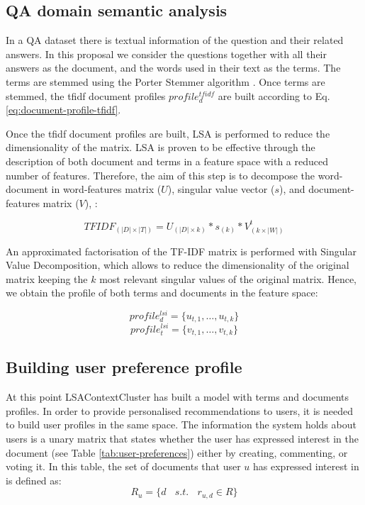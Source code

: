 \documentclass[preprint]{elsarticle}
\begin{document}
\begin{spacing}{1.5}
\subsection{QA domain semantic analysis}

In a QA dataset there is textual information of the question and their related answers. In this proposal we consider the questions together with all their answers as the document, and the words used in their text as the terms. The terms are stemmed using the Porter Stemmer algorithm \citep{Porter1980}. Once terms are stemmed, the tfidf document profiles $profile^{tfidf}_{d}$ are built according to Eq. \ref{eq:document-profile-tfidf}.

Once the tfidf document profiles are built, LSA is performed to reduce the dimensionality of the matrix. LSA is proven to be effective through the description of both document and terms in a feature space with a reduced number of features. Therefore, the aim of this step is to decompose the word-document in word-features matrix ($U$), singular value vector ($s$), and document-features matrix ($V$), :

\begin{equation}
	TFIDF_{(|D|\times|T|)} = U_{(|D|\times k)} * s_{(k)} * V^t_{(k \times |W|)}
\end{equation}

An approximated factorisation of the TF-IDF matrix is performed with Singular Value Decomposition, which allows to reduce the dimensionality of the original matrix keeping the $k$ most relevant singular values of the original matrix. Hence, we obtain the profile of both terms and documents in the feature space:

\begin{equation}
	profile^{lsi}_d = \{ u_{t,1},\dots, u_{t,k}\}
\end{equation}
\begin{equation}
	profile^{lsi}_t = \{ v_{t,1},\dots, v_{t,k}\}
\end{equation}

\subsection{Building user preference profile}

At this point LSAContextCluster has built a model with terms and documents profiles. In order to provide personalised recommendations to users, it is needed to build user profiles in the same space. The information the system holds about users is a unary matrix that states whether the user has expressed interest in the document (see Table \ref{tab:user-preferences}) either by creating, commenting, or voting it. In this table, the set of documents that user $u$ has expressed interest in is defined as:
\begin{equation}
	R_{u} = \{d ~~~~s.t.~~~~r_{u,d} \in R \}
\end{equation}


\end{spacing}
\end{document}
